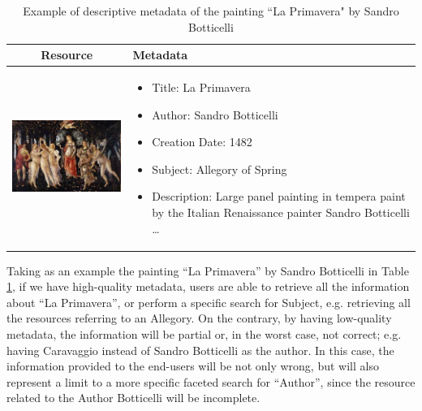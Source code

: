 \documentclass[epsfig,a4paper,12pt,titlepage]{book}
\begin{document}
\begin{table}[h!]
  \centering
  \begin{tabular}{ | c | m{8cm} | }
    \hline
    Resource & Metadata  \\ \hline
    \begin{minipage}{.3\textwidth}
      \includegraphics[width=\linewidth, height=40mm]{primavera.jpg}
    \end{minipage}
    &
      \begin{itemize}
        \item Title: La Primavera
        \item Author: Sandro Botticelli
        \item Creation Date: 1482
        \item Subject: Allegory of Spring
        \item Description: Large panel painting in tempera paint by the Italian Renaissance painter Sandro Botticelli \dots
      \end{itemize}
    
    \\ \hline
  \end{tabular}
  \caption{Example of descriptive metadata of the painting ``La Primavera" by Sandro Botticelli}\label{tbl:1}
\end{table}

Taking as an example the painting ``La Primavera'' by Sandro Botticelli in Table \ref{tbl:1}, if we have  high-quality metadata, users are able to retrieve all the information about ``La Primavera'', or perform a specific search for Subject, e.g. retrieving all the resources referring to an Allegory. On the contrary, by having low-quality metadata, the information  will be partial or, in the worst case, not correct; e.g. having Caravaggio instead of Sandro Botticelli as the author. In this case, the information provided to the end-users will be not only wrong, but will also represent a limit to a more specific faceted search for ``Author'', since the resource related to the Author Botticelli will be incomplete.  
\end{document}

